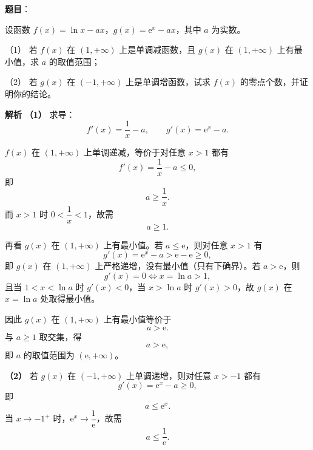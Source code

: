 \begin{answer}


\end{answer}
\begin{answer}

\textbf{题目}：

设函数 $f(x)=\ln x-ax$，$g(x)=\mathrm e^x-ax$，其中 $a$ 为实数。

（1） 若 $f(x)$ 在 $(1,+\infty)$ 上是单调减函数，且 $g(x)$ 在 $(1,+\infty)$ 上有最小值，求 $a$ 的取值范围；

（2） 若 $g(x)$ 在 $(-1,+\infty)$ 上是单调增函数，试求 $f(x)$ 的零点个数，并证明你的结论。

\textbf{解析}
\textbf{（1）} 求导：
\nopagebreak[4]
\[f'(x)=\frac1x-a,\qquad g'(x)=\mathrm e^x-a.\]

$f(x)$ 在 $(1,+\infty)$ 上单调递减，等价于对任意 $x>1$ 都有
\nopagebreak[4]
\[f'(x)=\frac1x-a\leqslant0,\]
即
\nopagebreak[4]
\[a\geqslant\frac1x.\]
而 $x>1$ 时 $0<\dfrac1x<1$，故需
\nopagebreak[4]
\[a\geqslant1.\]

再看 $g(x)$ 在 $(1,+\infty)$ 上有最小值。若 $a\leqslant\mathrm e$，则对任意 $x>1$ 有
\nopagebreak[4]
\[g'(x)=\mathrm e^x-a>\mathrm e-\mathrm e\geqslant0,\]
即 $g(x)$ 在 $(1,+\infty)$ 上严格递增，没有最小值（只有下确界）。若 $a>\mathrm e$，则
\nopagebreak[4]
\[g'(x)=0\Longleftrightarrow x=\ln a>1,\]
且当 $1<x<\ln a$ 时 $g'(x)<0$，当 $x>\ln a$ 时 $g'(x)>0$，故 $g(x)$ 在 $x=\ln a$ 处取得最小值。

因此 $g(x)$ 在 $(1,+\infty)$ 上有最小值等价于
\nopagebreak[4]
\[a>\mathrm e.\]
与 $a\geqslant1$ 取交集，得
\nopagebreak[4]
\[a>\mathrm e,\]
即 $a$ 的取值范围为 $(\mathrm e,+\infty)$。

\textbf{（2）} 若 $g(x)$ 在 $(-1,+\infty)$ 上单调递增，则对任意 $x>-1$ 都有
\nopagebreak[4]
\[g'(x)=\mathrm e^x-a\geqslant0,\]
即
\nopagebreak[4]
\[a\leqslant\mathrm e^x.\]
当 $x\to-1^+$ 时，$\mathrm e^x\to\dfrac1{\mathrm e}$，故需
\nopagebreak[4]
\[a\leqslant\frac1{\mathrm e}.\]


\end{answer}
